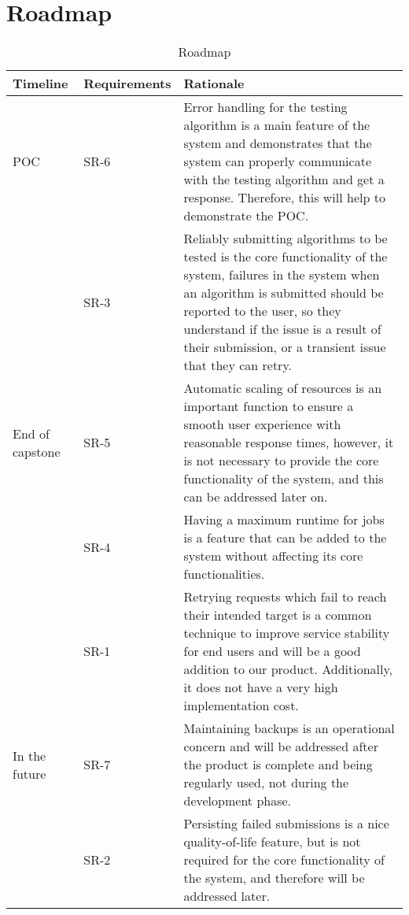 \documentclass{article}
\begin{document}
\section{Roadmap}

\begin{table}[h]
    \centering
    \caption{Roadmap} \label{TblRoadmap}
    \begin{tabularx}{\textwidth}{|P{3cm}|P{3cm}|P{9.2cm}|}
        \hline
        \textbf{Timeline} & \textbf{Requirements} & \textbf{Rationale}\\
        \hline
        POC & SR-6 & Error handling for the testing algorithm is a main feature of the system and demonstrates that the system can properly communicate with the testing algorithm and get a response. Therefore, this will help to demonstrate the POC.\\
        & SR-3 & Reliably submitting algorithms to be tested is the core functionality of the system, failures in the system when an algorithm is submitted should be reported to the user, so they understand if the issue is a result of their submission, or a transient issue that they can retry.\\
        \hline
        End of capstone & SR-5 & Automatic scaling of resources is an important function to ensure a smooth user experience with reasonable response times, however, it is not necessary to provide the core functionality of the system, and this can be addressed later on.\\
        & SR-4 & Having a maximum runtime for jobs is a feature that can be added to the system without affecting its core functionalities.\\
        & SR-1 & Retrying requests which fail to reach their intended target is a common technique to improve service stability for end users and will be a good addition to our product. Additionally, it does not have a very high implementation cost.\\
        \hline
        In the future & SR-7 & Maintaining backups is an operational concern and will be addressed after the product is complete and being regularly used, not during the development phase.\\
        & SR-2 & Persisting failed submissions is a nice quality-of-life feature, but is not required for the core functionality of the system, and therefore will be addressed later.\\
        \hline
    \end{tabularx}
\end{table}
\newpage{}
\end{document}
